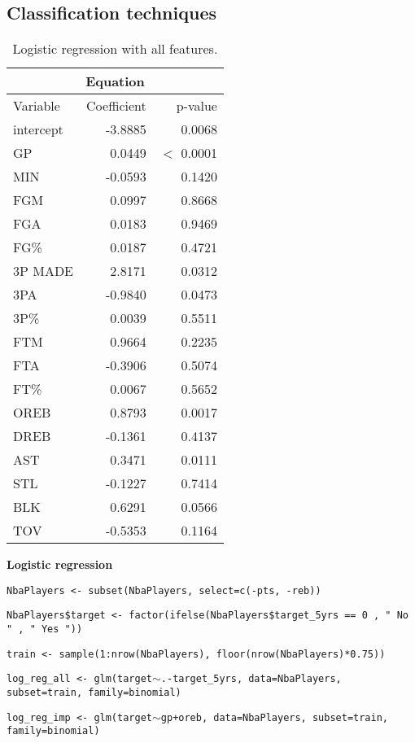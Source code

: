 \subsection*{Classification techniques}\label{appendix:ct}

\begin{table}[H]
	\centering
	\begin{tabular}{|| l | r | r ||} 
		\hline
		\multicolumn{3}{|c|}{Equation} \\
		\hline
		Variable & Coefficient & p-value \\
		\hline
		intercept & -3.8885 & 0.0068 \\
		GP & 0.0449 & $<$ 0.0001 \\
		MIN & -0.0593 & 0.1420 \\
		FGM & 0.0997 & 0.8668 \\
		FGA & 0.0183 & 0.9469 \\
		FG\% & 0.0187 & 0.4721 \\
		3P MADE & 2.8171 & 0.0312 \\
		3PA & -0.9840 & 0.0473 \\
		3P\% & 0.0039 & 0.5511 \\
		FTM & 0.9664 & 0.2235 \\
		FTA & -0.3906 & 0.5074 \\
		FT\% & 0.0067 & 0.5652 \\
		OREB & 0.8793 & 0.0017 \\
		DREB & -0.1361 & 0.4137 \\
		AST & 0.3471 & 0.0111 \\
		STL & -0.1227 & 0.7414 \\
		BLK & 0.6291 & 0.0566 \\				
		TOV & -0.5353 & 0.1164 \\		
		\hline
	\end{tabular}
	\caption{Logistic regression with all features.}
	\label{table:LRAllSum}
\end{table}

\noindent
\textbf{Logistic regression}

\begin{center}
\texttt{NbaPlayers <- subset(NbaPlayers, select=c(-pts, -reb))}

\texttt{NbaPlayers\$target <- factor(ifelse(NbaPlayers\$target\_5yrs == 0 , " No " , " Yes "))}

\texttt{train <- sample(1:nrow(NbaPlayers), floor(nrow(NbaPlayers)*0.75))}

\texttt{log\_reg\_all <- glm(target$\sim$.-target\_5yrs, data=NbaPlayers, subset=train, family=binomial)}

\texttt{log\_reg\_imp <- glm(target$\sim$gp+oreb, data=NbaPlayers, subset=train, family=binomial)}
\end{center}

